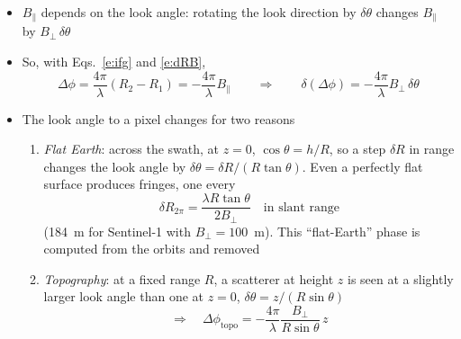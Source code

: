 \documentclass[11pt, oneside]{article}
\newcommand{\Bperp}{B_\perp}
\newcommand{\Bpar}{B_\parallel}
\begin{document}
\begin{itemize}
	\item $\Bpar$ depends on the look angle: rotating the look direction by $\delta\theta$ changes $\Bpar$ by $\Bperp\,\delta\theta$
	\item So, with Eqs.~\eqref{e:ifg} and \eqref{e:dRB},
	\begin{equation}
		\label{e:dphidtheta}
		\Delta\phi = \frac{4\pi}{\lambda}(R_2 - R_1) = -\frac{4\pi}{\lambda}\Bpar \qquad\Rightarrow\qquad \delta(\Delta\phi) = -\frac{4\pi}{\lambda}\Bperp\,\delta\theta
	\end{equation}
	\item The look angle to a pixel changes for two reasons
	\begin{enumerate}
		\item \emph{Flat Earth}: across the swath, at $z = 0$, $\cos\theta = h/R$, so a step $\delta R$ in range changes the look angle by $\delta\theta = \delta R/(R\tan\theta)$. Even a perfectly flat surface produces fringes, one every
		\begin{equation}
			\label{e:flat}
			\delta R_{2\pi} = \frac{\lambda R\tan\theta}{2\Bperp} \quad\text{in slant range}
		\end{equation}
		(184~m for Sentinel-1 with $\Bperp = 100$~m). This ``flat-Earth'' phase is computed from the orbits and removed
		\item \emph{Topography}: at a fixed range $R$, a scatterer at height $z$ is seen at a slightly larger look angle than one at $z = 0$, $\delta\theta = z/(R\sin\theta)$
		\begin{equation}
			\label{e:topo}
			\Rightarrow\quad \Delta\phi_\mathrm{topo} = -\frac{4\pi}{\lambda}\frac{\Bperp}{R\sin\theta}\,z
		\end{equation}
	\end{enumerate}

\end{itemize}
\end{document}
